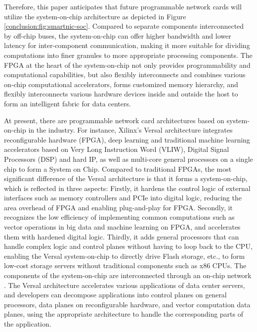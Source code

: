 Therefore, this paper anticipates that future programmable network cards will utilize the system-on-chip architecture as depicted in Figure \ref{conclusion:fig:smartnic-soc}. Compared to separate components interconnected by off-chip buses, the system-on-chip can offer higher bandwidth and lower latency for inter-component communication, making it more suitable for dividing computations into finer granules to more appropriate processing components. The FPGA at the heart of the system-on-chip not only provides programmability and computational capabilities, but also flexibly interconnects and combines various on-chip computational accelerators, forms customized memory hierarchy, and flexibly interconnects various hardware devices inside and outside the host to form an intelligent fabric for data centers.

At present, there are programmable network card architectures based on system-on-chip in the industry. For instance, Xilinx's Versal architecture \cite{vissers2018keynote,vissers2019versal,gaide2019xilinx} integrates reconfigurable hardware (FPGA), deep learning and traditional machine learning accelerators based on Very Long Instruction Word (VLIW), Digital Signal Processors (DSP) and hard IP, as well as multi-core general processors on a single chip to form a System on Chip. Compared to traditional FPGAs, the most significant difference of the Versal architecture is that it forms a system-on-chip, which is reflected in three aspects: Firstly, it hardens the control logic of external interfaces such as memory controllers and PCIe into digital logic, reducing the area overhead of FPGA and enabling plug-and-play for FPGA. Secondly, it recognizes the low efficiency of implementing common computations such as vector operations in big data and machine learning on FPGA, and accelerates them with hardened digital logic. Thirdly, it adds general processors that can handle complex logic and control planes without having to loop back to the CPU, enabling the Versal system-on-chip to directly drive Flash storage, etc., to form low-cost storage servers without traditional components such as x86 CPUs. The components of the system-on-chip are interconnected through an on-chip network \cite{swarbrick2019network,gaide2019xilinx}. The Versal architecture accelerates various applications of data center servers, and developers can decompose applications into control planes on general processors, data planes on reconfigurable hardware, and vector computation data planes, using the appropriate architecture to handle the corresponding parts of the application.

